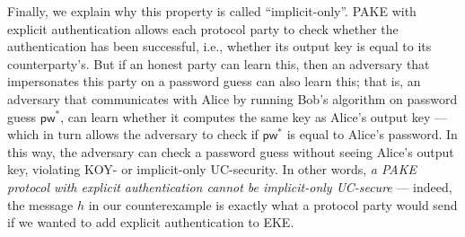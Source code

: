 \documentclass{article}
\newcommand{\pw}{\mathsf{pw}}
\begin{document}
Finally, we explain why this property is called ``implicit-only''. PAKE with explicit authentication allows each protocol party to check whether the authentication has been successful, i.e., whether its output key is equal to its counterparty's. But if an honest party can learn this, then an adversary that impersonates this party on a password guess can also learn this; that is, an adversary that communicates with Alice by running Bob's algorithm on password guess $\pw^*$, can learn whether it computes the same key as Alice's output key --- which in turn allows the adversary to check if $\pw^*$ is equal to Alice's password. In this way, the adversary can check a password guess without seeing Alice's output key, violating KOY- or implicit-only UC-security. In other words, \emph{a PAKE protocol with explicit authentication cannot be implicit-only UC-secure} --- indeed, the message $h$ in our counterexample is exactly what a protocol party would send if we wanted to add explicit authentication to EKE.



\end{document}
